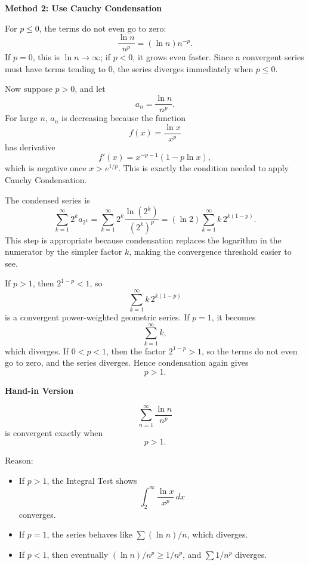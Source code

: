 \documentclass[a4paper,12pt,twocolumn]{article}
\newenvironment{solutionbox}{\begin{framed}}{\end{framed}}
\begin{document}
\begin{solutionbox}
\textbf{Method 2: Use Cauchy Condensation}

\begin{steps}
\item For \(p\le 0\), the terms do not even go to zero:
\[
\frac{\ln n}{n^p}=(\ln n)n^{-p}.
\]
If \(p=0\), this is \(\ln n\to\infty\); if \(p<0\), it grows even faster. Since a convergent series must have terms tending to \(0\), the series diverges immediately when \(p\le 0\).

\item Now suppose \(p>0\), and let
\[
a_n=\frac{\ln n}{n^p}.
\]
For large \(n\), \(a_n\) is decreasing because the function
\[
f(x)=\frac{\ln x}{x^p}
\]
has derivative
\[
f'(x)=x^{-p-1}(1-p\ln x),
\]
which is negative once \(x>e^{1/p}\). This is exactly the condition needed to apply Cauchy Condensation.

\item The condensed series is
\[
\sum_{k=1}^\infty 2^k a_{2^k}
=\sum_{k=1}^\infty 2^k\frac{\ln(2^k)}{(2^k)^p}
=(\ln 2)\sum_{k=1}^\infty k\,2^{k(1-p)}.
\]
This step is appropriate because condensation replaces the logarithm in the numerator by the simpler factor \(k\), making the convergence threshold easier to see.

\item If \(p>1\), then \(2^{1-p}<1\), so
\[
\sum_{k=1}^\infty k\,2^{k(1-p)}
\]
is a convergent power-weighted geometric series. If \(p=1\), it becomes
\[
\sum_{k=1}^\infty k,
\]
which diverges. If \(0<p<1\), then the factor \(2^{1-p}>1\), so the terms do not even go to zero, and the series diverges. Hence condensation again gives
\[
\boxed{p>1}.
\]
\end{steps}
\end{solutionbox}

\begin{solutionbox}
\textbf{Hand-in Version}

\[
\sum_{n=1}^{\infty}\frac{\ln n}{n^p}
\]
is convergent exactly when
\[
\boxed{p>1.}
\]

Reason:
\begin{itemize}[leftmargin=*]
\item If \(p>1\), the Integral Test shows
\[
\int_2^\infty \frac{\ln x}{x^p}\,dx
\]
converges.
\item If \(p=1\), the series behaves like \(\sum (\ln n)/n\), which diverges.
\item If \(p<1\), then eventually \((\ln n)/n^p\ge 1/n^p\), and \(\sum 1/n^p\) diverges.
\end{itemize}
\end{solutionbox}
\end{document}
